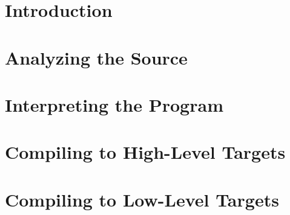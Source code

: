 


\captionsetup{indention=-1cm}
\renewcommand{\theContinuedFloat}{\alph{ContinuedFloat}} %


% 


\NewCommandCopy{\oldLirsting}{\Lirsting}
\renewcommand{\Lirsting}[2][]{\oldLirsting[path prefix={deps/rush},#1]{#2}}





\tableofcontents

\cleardoublepage{}

\chapter{Introduction}\label{chap:introduction}




\chapter{Analyzing the Source}\label{chap:analyzing_source}



\chapter{Interpreting the Program}\label{chap:interpreting}




\chapter{Compiling to High-Level Targets}\label{chap:high_level_targets}






\chapter{Compiling to Low-Level Targets}\label{chap:low_level_targets}





